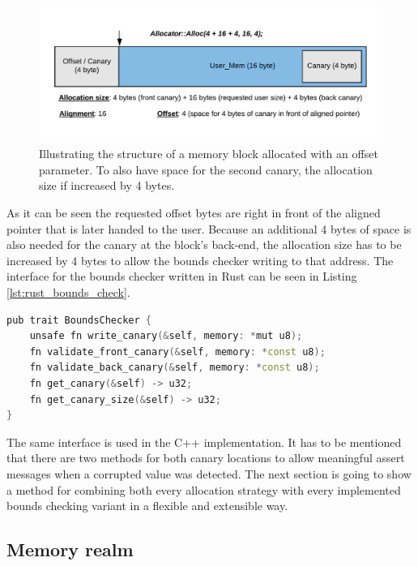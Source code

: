 \clearpage

\begin{figure}[h!]
	\centering \includegraphics[width=\linewidth]{PICs/offset_alloc.png}
	\caption{Illustrating the structure of a memory block allocated with an offset parameter. To also have space for the second canary, the allocation size if increased by 4 bytes.}
	\label{fig:offset_alloc}
\end{figure}

\noindent
As it can be seen the requested offset bytes are right in front of the aligned pointer that is later handed to the user. Because an additional 4 bytes of space is also needed for the canary at the block's back-end, the allocation size has to be increased by 4 bytes to allow the bounds checker writing to that address. The interface for the bounds checker written in Rust can be seen in Listing \ref{lst:rust_bounds_check}.\\

\begin{lstlisting}[caption={Base trait of every bounds checker in the Rust memory system.}, label={lst:rust_bounds_check}, language={C++}]
pub trait BoundsChecker {
	unsafe fn write_canary(&self, memory: *mut u8);
	fn validate_front_canary(&self, memory: *const u8);
	fn validate_back_canary(&self, memory: *const u8);
	fn get_canary(&self) -> u32;
	fn get_canary_size(&self) -> u32;
}
\end{lstlisting}

\noindent
The same interface is used in the C++ implementation. It has to be mentioned that there are two methods for both canary locations to allow meaningful assert messages when a corrupted value was detected. The next section is going to show a method for combining both every allocation strategy with every implemented bounds checking variant in a flexible and extensible way.

\subsection{Memory realm}

